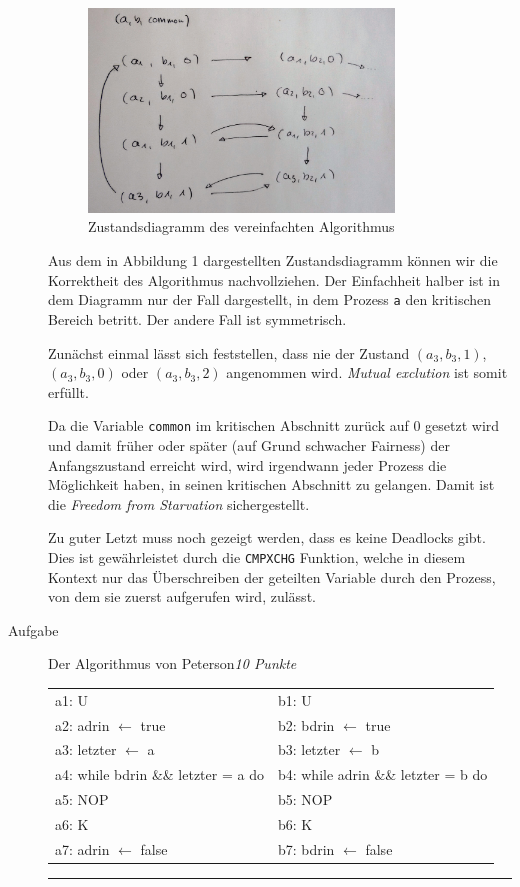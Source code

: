 \documentclass[a4paper,twoside,12pt,fleqn]{article}
\newcounter{AUFGNR}
\newcommand{\AUFGABE}[2]{\vspace{0.3cm}\item[Aufgabe~\arabic{AUFGNR}]\stepcounter{AUFGNR} #1\hfill\emph{#2}}
\begin{document}
\begin{description}
	\begin{figure}[htbp]
		\centering
		\includegraphics[width=0.8\textwidth]{zustand.jpg}
		\caption{Zustandsdiagramm des vereinfachten Algorithmus}
		\label{zsd}
	\end{figure}

	Aus dem in Abbildung 1 dargestellten Zustandsdiagramm können wir die Korrektheit des Algorithmus nachvollziehen. Der Einfachheit halber ist in dem Diagramm nur der Fall dargestellt, in dem Prozess \texttt{a} den kritischen Bereich betritt. Der andere Fall ist symmetrisch.

	Zunächst einmal lässt sich feststellen, dass nie der Zustand $(a_3, b_3, 1)$, $(a_3, b_3, 0)$ oder $(a_3, b_3, 2)$ angenommen wird. \textit{Mutual exclution} ist somit erfüllt.

	Da die Variable \texttt{common} im kritischen Abschnitt zurück auf $0$ gesetzt wird und damit früher oder später (auf Grund schwacher Fairness) der Anfangszustand erreicht wird, wird irgendwann jeder Prozess die Möglichkeit haben, in seinen kritischen Abschnitt zu gelangen. Damit ist die \textit{Freedom from Starvation} sichergestellt.

	Zu guter Letzt muss noch gezeigt werden, dass es keine Deadlocks gibt. Dies ist gewährleistet durch die \texttt{CMPXCHG} Funktion, welche in diesem Kontext nur das Überschreiben der geteilten Variable durch den Prozess, von dem sie zuerst aufgerufen wird, zulässt.


	\AUFGABE{Der Algorithmus von Peterson}{10 Punkte}
	\begin{tabular}{l|l}
		a1: U                               & b1: U                        \\
		a2: adrin $\leftarrow$ true         & b2: bdrin $\leftarrow$ true  \\
		a3: letzter $\leftarrow$ a          & b3: letzter $\leftarrow$ b   \\
		a4: while bdrin \&\& letzter = a do &
		b4: while adrin \&\& letzter = b do                                \\
		a5: \quad NOP                       & b5: \quad NOP                \\
		a6: K                               & b6: K                        \\
		a7: adrin $\leftarrow$ false        & b7: bdrin $\leftarrow$ false
	\end{tabular}
	\hrule


\end{description}
\end{document}
